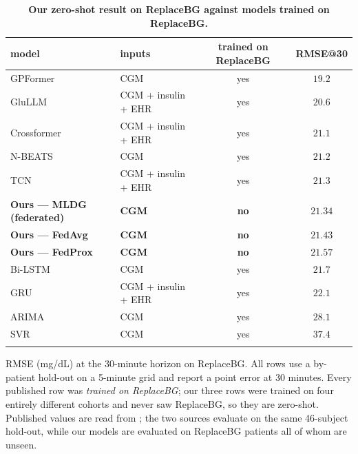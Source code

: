 \documentclass[10pt,letterpaper]{article}
\newlength\savedwidth
\newcommand\thickhline{\noalign{\global\savedwidth\arrayrulewidth\global\arrayrulewidth 2pt}%
\hline
\noalign{\global\arrayrulewidth\savedwidth}}
\begin{document}
\begin{table}[!ht]
\centering
\captionsetup{justification=centering,singlelinecheck=on}
\caption{\bf Our zero-shot result on ReplaceBG against models trained on ReplaceBG.}
\label{tab:oodprior}
\begin{tabular}{llcc}
\thickhline
model & inputs & trained on ReplaceBG & RMSE@30 \\
\hline
GPFormer \cite{zhu2024gpformer}    & CGM                & yes & $19.2$ \\
GluLLM \cite{zhu2026glullm}        & CGM + insulin + EHR & yes & $20.6$ \\
Crossformer \cite{zhu2026glullm}   & CGM + insulin + EHR & yes & $21.1$ \\
N-BEATS \cite{zhu2024gpformer}     & CGM                & yes & $21.2$ \\
TCN \cite{zhu2026glullm}           & CGM + insulin + EHR & yes & $21.3$ \\
\textbf{Ours --- MLDG (federated)} & \textbf{CGM}       & \textbf{no} & $\mathbf{21.34}$ \\
\textbf{Ours --- FedAvg}           & \textbf{CGM}       & \textbf{no} & $\mathbf{21.43}$ \\
\textbf{Ours --- FedProx}          & \textbf{CGM}       & \textbf{no} & $\mathbf{21.57}$ \\
Bi-LSTM \cite{zhu2024gpformer}     & CGM                & yes & $21.7$ \\
GRU \cite{zhu2026glullm}           & CGM + insulin + EHR & yes & $22.1$ \\
ARIMA \cite{zhu2024gpformer}       & CGM                & yes & $28.1$ \\
SVR \cite{zhu2024gpformer}         & CGM                & yes & $37.4$ \\
\thickhline
\end{tabular}
\begin{center}
{\small RMSE (mg/dL) at the 30-minute horizon on ReplaceBG. All rows use a
by-patient hold-out on a 5-minute grid and report a point error at 30 minutes.
Every published row was \emph{trained on ReplaceBG}; our three rows were trained
on four entirely different cohorts and never saw ReplaceBG, so they are zero-shot.
Published values are read from \cite{zhu2024gpformer,zhu2026glullm}; the two
sources evaluate on the same 46-subject hold-out, while our models are evaluated
on ReplaceBG patients all of whom are unseen.}
\end{center}
\end{table}
\end{document}
